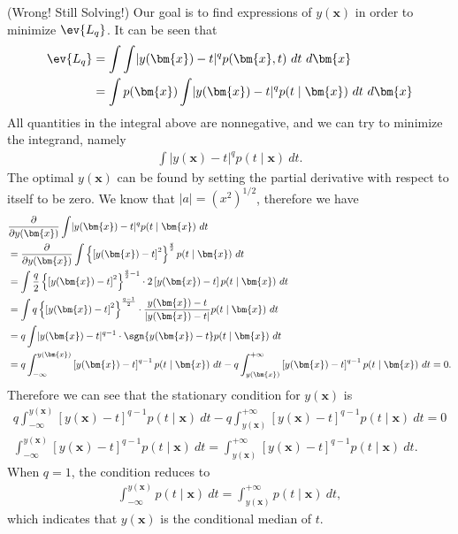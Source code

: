 \begin{answer}{(Wrong! Still Solving!)}
	Our goal is to find expressions of $y(\bm{x})$ in order to minimize $\ev{L_q}$. It can be seen that
	\begin{align}
		\ev{L_q} &= \int\int \lvert y(\bm{x}) - t \rvert^q p(\bm{x}, t)\ dt\ d\bm{x}\\
		&= \int p(\bm{x}) \int \lvert y(\bm{x}) - t \rvert^q p(t \mid \bm{x}) \ dt\ d\bm{x}
	\end{align}
	All quantities in the integral above are nonnegative, and we can try to minimize the integrand, namely
	\begin{align}
		\int \lvert y(\bm{x}) - t \rvert^q p(t \mid \bm{x})\ dt.
	\end{align}
	The optimal $y(\bm{x})$ can be found by setting the partial derivative with respect to itself to be zero. We know that $\lvert a \rvert = \left(x^2 \right)^{1/2}$, therefore we have
	\begin{align}
		&\frac{\partial}{\partial y(\bm{x})}\int \lvert y(\bm{x}) - t \rvert^q p(t \mid \bm{x})\ dt\\
		&= \frac{\partial}{\partial y(\bm{x})}\int \left\{\left[ y(\bm{x}) - t \right]^2\right\}^{\frac{q}{2}} p(t \mid \bm{x})\ dt\\
		&= \int  \frac{q}{2} \left\{\left[ y(\bm{x}) - t \right]^2\right\}^{\frac{q}{2} - 1}\cdot 2\left[ y(\bm{x}) - t \right]p(t \mid \bm{x})\ dt\\
		&= \int q \left\{\left[ y(\bm{x}) - t \right]^2\right\}^{\frac{q-1}{2}} \cdot \frac{ y(\bm{x}) - t }{\left\lvert y(\bm{x}) - t\right\rvert}p(t \mid \bm{x})\ dt\\
		&= q \int \lvert y(\bm{x}) - t \rvert^{q-1} \cdot \sgn{y(\bm{x}) - t }p(t \mid \bm{x})\ dt\\
		&= q \int_{-\infty}^{y(\bm{x})} \left[ y(\bm{x}) - t \right]^{q-1} p(t \mid \bm{x})\ dt - q \int_{y(\bm{x})}^{+\infty} \left[ y(\bm{x}) - t \right]^{q-1}p(t \mid \bm{x})\ dt = 0.
	\end{align}
	Therefore we can see that the stationary condition for $y(\bm{x})$ is
	\begin{gather}
		q \int_{-\infty}^{y(\bm{x})} \left[ y(\bm{x}) - t \right]^{q-1} p(t \mid \bm{x})\ dt - q \int_{y(\bm{x})}^{+\infty} \left[ y(\bm{x}) - t \right]^{q-1}p(t \mid \bm{x})\ dt = 0\\
		 \int_{-\infty}^{y(\bm{x})} \left[ y(\bm{x}) - t \right]^{q-1} p(t \mid \bm{x})\ dt =  \int_{y(\bm{x})}^{+\infty} \left[ y(\bm{x}) - t \right]^{q-1}p(t \mid \bm{x})\ dt.
	\end{gather}
	When $q = 1$, the condition reduces to
	\begin{align}
		\int_{-\infty}^{y(\bm{x})} p(t \mid \bm{x})\ dt =  \int_{y(\bm{x})}^{+\infty}p(t \mid \bm{x})\ dt,
	\end{align}
	which indicates that $y(\bm{x})$ is the conditional median of $t$.
	

\end{answer}
